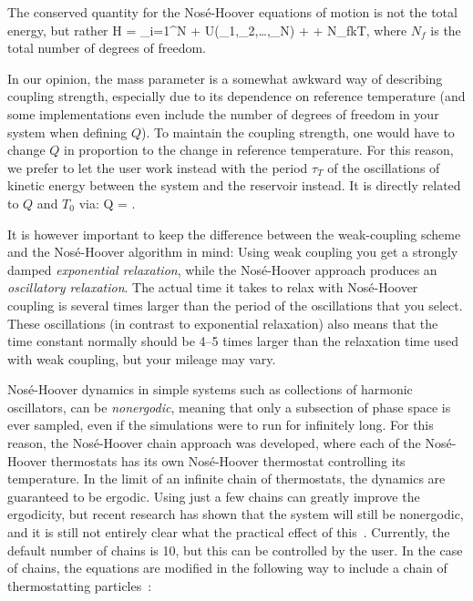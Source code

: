 \documentclass[11pt,a4paper,twoside]{article}
\begin{document}
The conserved quantity for the Nos{\'e}-Hoover equations of motion is not 
the total energy, but rather
\bea
H = \sum_{i=1}^{N}  + U\left(\rv_1,\rv_2,\ldots,\rv_N\right) + + N_fkT\xi,
\eea
where $N_f$ is the total number of degrees of freedom.

In our opinion, the mass parameter is a somewhat awkward way of
describing coupling strength, especially due to its dependence on
reference temperature (and some implementations even include the
number of degrees of freedom in your system when defining $Q$).  To
maintain the coupling strength, one would have to change $Q$ in
proportion to the change in reference temperature. For this reason, we
prefer to let the {\gromacs} user work instead with the period
$\tau_T$ of the oscillations of kinetic energy between the system and
the reservoir instead. It is directly related to $Q$ and $T_0$ via:
\beq
Q = .
\eeq

It is however important to keep the difference between the
weak-coupling scheme and the Nos{\'e}-Hoover algorithm in mind: Using
weak coupling you get a strongly damped {\em exponential relaxation},
while the Nos{\'e}-Hoover approach produces an {\em oscillatory
  relaxation}.  The actual time it takes to relax with Nos{\'e}-Hoover
coupling is several times larger than the period of the oscillations
that you select. These oscillations (in contrast to exponential
relaxation) also means that the time constant normally should be 4--5
times larger than the relaxation time used with weak coupling, but
your mileage may vary.

Nos{\'e}-Hoover dynamics in simple systems such as collections of
harmonic oscillators, can be {\em nonergodic}, meaning that only a
subsection of phase space is ever sampled, even if the simulations
were to run for infinitely long.  For this reason, the Nos{\'e}-Hoover
chain approach was developed, where each of the Nos{\'e}-Hoover
thermostats has its own Nos{\'e}-Hoover thermostat controlling its
temperature.  In the limit of an infinite chain of thermostats, the
dynamics are guaranteed to be ergodic. Using just a few chains can
greatly improve the ergodicity, but recent research has shown that the
system will still be nonergodic, and it is still not entirely clear
what the practical effect of this~\cite{Cooke2008}. Currently, the
default number of chains is 10, but this can be controlled by the
user.  In the case of chains, the equations are modified in the
following way to include a chain of thermostatting
particles~\cite{Martyna1992}:
\end{document}
